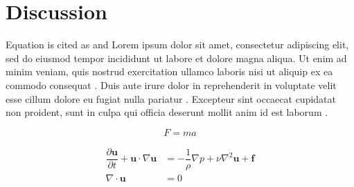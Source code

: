 \chapter{Discussion}
\label{chap:discussion}

Equation is cited as  and 
Lorem ipsum dolor sit amet, consectetur adipiscing elit, sed do eiusmod tempor incididunt ut labore et dolore magna aliqua. Ut enim ad minim veniam, quis nostrud exercitation ullamco laboris nisi ut aliquip ex ea commodo consequat \textcite{ref1}. Duis aute irure dolor in reprehenderit in voluptate velit esse cillum dolore eu fugiat nulla pariatur \textcite{ref2}. Excepteur sint occaecat cupidatat non proident, sunt in culpa qui officia deserunt mollit anim id est laborum \textcite{ref3}.


\begin{equation}
	F=ma
	\label{eq:fma}
\end{equation}

\begin{align}
    \dfrac{\partial \mathbf{u}}{\partial t} + \mathbf{u} \cdot \nabla \mathbf{u} 
        &= -\dfrac{1}{\rho} \nabla p +  \nu \nabla^2 \mathbf{u} + \mathbf{f} \\
	\nabla \cdot \mathbf{u} &= 0
	\label{eq:ns-eq}
\end{align}

